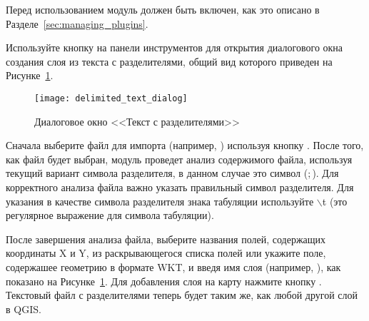 Перед использованием модуль должен быть включен, как это описано в
Разделе~\ref{sec:managing_plugins}.

Используйте кнопку 
на панели инструментов для открытия диалогового окна создания слоя из
текста с разделителями, общий вид которого приведен на Рисунке~\ref{fig:delim_text_plugin_dialog}.

\begin{figure}[ht]
   \centering
   \texttt{[image: delimited\_text\_dialog]}
   \caption{Диалоговое окно <<Текст с разделителями>> \wincaption}\label{fig:delim_text_plugin_dialog}
\end{figure}

Сначала выберите файл для импорта (например, )
используя кнопку . После того, как файл будет выбран, модуль
проведет анализ содержимого файла, используя текущий вариант символа
разделителя, в данном случае это символ (\mbox{$;$}). Для корректного
анализа файла важно указать правильный символ разделителя. Для указания
в качестве символа разделителя знака табуляции используйте
\mbox{$\backslash$}t (это регулярное выражение для символа табуляции).

После завершения анализа файла, выберите названия полей, содержащих
координаты X и Y, из раскрывающегося списка полей или укажите поле,
содержашее геометрию в формате WKT, и введя имя слоя
(например, ), как показано на Рисунке~\ref{fig:delim_text_plugin_dialog}.
Для добавления слоя на карту нажмите кнопку . Текстовый файл
с разделителями теперь будет таким же, как любой другой слой в QGIS.

\FloatBarrier
